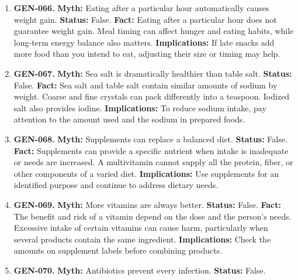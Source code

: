 \documentclass[11pt,oneside]{book}
\begin{document}
\begin{enumerate}[leftmargin=0pt,labelwidth=0pt,labelsep=0pt,itemindent=0pt]
\item[] \textbf{GEN-066.} \textbf{Myth:} Eating after a particular hour automatically causes weight gain.\newline
\textbf{Status:} False.\newline
\textbf{Fact:} Eating after a particular hour does not guarantee weight gain. Meal timing can affect hunger and eating habits, while long-term energy balance also matters. \cite{ref191}\newline
\textbf{Implications:} If late snacks add more food than you intend to eat, adjusting their size or timing may help.
\item[] \textbf{GEN-067.} \textbf{Myth:} Sea salt is dramatically healthier than table salt.\newline
\textbf{Status:} False.\newline
\textbf{Fact:} Sea salt and table salt contain similar amounts of sodium by weight. Coarse and fine crystals can pack differently into a teaspoon. Iodized salt also provides iodine. \cite{ref46}\newline
\textbf{Implications:} To reduce sodium intake, pay attention to the amount used and the sodium in prepared foods.
\item[] \textbf{GEN-068.} \textbf{Myth:} Supplements can replace a balanced diet.\newline
\textbf{Status:} False.\newline
\textbf{Fact:} Supplements can provide a specific nutrient when intake is inadequate or needs are increased. A multivitamin cannot supply all the protein, fiber, or other components of a varied diet. \cite{ref20}\newline
\textbf{Implications:} Use supplements for an identified purpose and continue to address dietary needs.
\item[] \textbf{GEN-069.} \textbf{Myth:} More vitamins are always better.\newline
\textbf{Status:} False.\newline
\textbf{Fact:} The benefit and risk of a vitamin depend on the dose and the person's needs. Excessive intake of certain vitamins can cause harm, particularly when several products contain the same ingredient. \cite{ref20}\newline
\textbf{Implications:} Check the amounts on supplement labels before combining products.
\item[] \textbf{GEN-070.} \textbf{Myth:} Antibiotics prevent every infection.\newline
\textbf{Status:} False.\newline

\end{enumerate}
\end{document}
